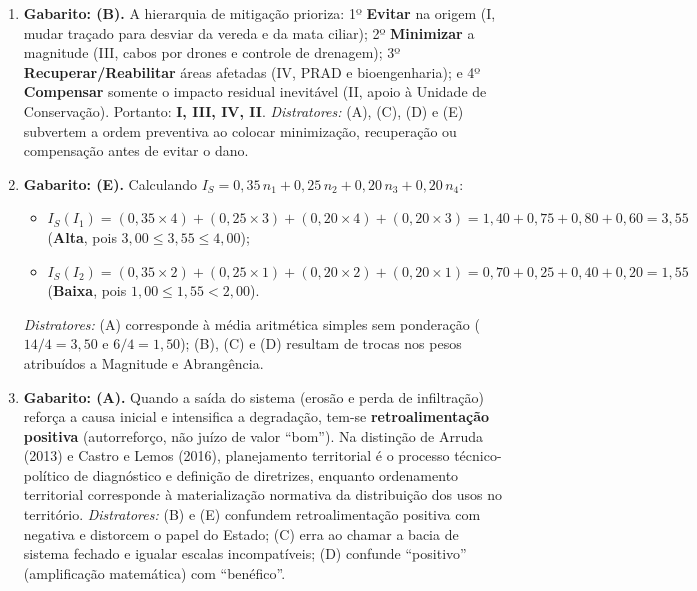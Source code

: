 \begin{boxGabarito}
\begin{enumerate}[leftmargin=1.8em, itemsep=5pt]
  \item \textbf{Gabarito: (B).} A hierarquia de mitigação prioriza: 1º \textbf{Evitar} na origem (I, mudar traçado para desviar da vereda e da mata ciliar); 2º \textbf{Minimizar} a magnitude (III, cabos por drones e controle de drenagem); 3º \textbf{Recuperar/Reabilitar} áreas afetadas (IV, PRAD e bioengenharia); e 4º \textbf{Compensar} somente o impacto residual inevitável (II, apoio à Unidade de Conservação). Portanto: \textbf{I, III, IV, II}. \textit{Distratores:} (A), (C), (D) e (E) subvertem a ordem preventiva ao colocar minimização, recuperação ou compensação antes de evitar o dano.

  \item \textbf{Gabarito: (E).} Calculando $I_S = 0,35\,n_1 + 0,25\,n_2 + 0,20\,n_3 + 0,20\,n_4$:
  \begin{itemize}[leftmargin=1.4em, itemsep=1pt, topsep=2pt]
    \item $I_S(I_1) = (0,35 \times 4) + (0,25 \times 3) + (0,20 \times 4) + (0,20 \times 3) = 1,40 + 0,75 + 0,80 + 0,60 = 3,55$ (\textbf{Alta}, pois $3,00 \le 3,55 \le 4,00$);
    \item $I_S(I_2) = (0,35 \times 2) + (0,25 \times 1) + (0,20 \times 2) + (0,20 \times 1) = 0,70 + 0,25 + 0,40 + 0,20 = 1,55$ (\textbf{Baixa}, pois $1,00 \le 1,55 < 2,00$).
  \end{itemize}
  \textit{Distratores:} (A) corresponde à média aritmética simples sem ponderação ($14/4 = 3,50$ e $6/4 = 1,50$); (B), (C) e (D) resultam de trocas nos pesos atribuídos a Magnitude e Abrangência.

  \item \textbf{Gabarito: (A).} Quando a saída do sistema (erosão e perda de infiltração) reforça a causa inicial e intensifica a degradação, tem-se \textbf{retroalimentação positiva} (autorreforço, não juízo de valor ``bom''). Na distinção de Arruda (2013) e Castro e Lemos (2016), planejamento territorial é o processo técnico-político de diagnóstico e definição de diretrizes, enquanto ordenamento territorial corresponde à materialização normativa da distribuição dos usos no território. \textit{Distratores:} (B) e (E) confundem retroalimentação positiva com negativa e distorcem o papel do Estado; (C) erra ao chamar a bacia de sistema fechado e igualar escalas incompatíveis; (D) confunde ``positivo'' (amplificação matemática) com ``benéfico''.


\end{enumerate}
\end{boxGabarito}
